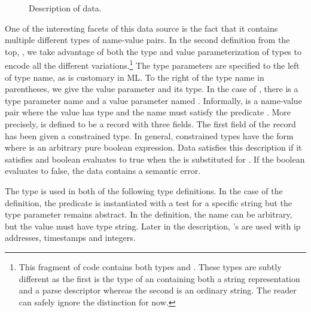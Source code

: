 
\begin{figure}
  \centering
  \small
  
  \caption{Description of \darkstar{} data.}
  \label{fig:darkstar-ml}
\end{figure}

One of the interesting facets of this data source is the fact that
it contains multiple different types of name-value pairs.  In the
second definition from the top, , we take
advantage of both the type and value parameterization of types to
encode all the different 
variations.\footnote{This fragment of code contains both
types  and .  These types are subtly different
as the first is the type of an \pvalue{} containing both a string 
representation and a parse descriptor whereas the second is an 
ordinary string.  The reader can safely ignore the distinction for now.}    
The type parameters
are specified to the left of type name, as is customary in ML.
To the right of the type name in parentheses, we give the
value parameter and its type. 
In the case of , there is a type parameter name 
and a value parameter named .  Informally,
 is a name-value pair where the value has type 
and the name must satisfy the predicate .  More precisely,
 is defined to be
a record with three fields.  The first field of the record
has been given a constrained type.  In general, constrained types have the
form  where  is an arbitrary pure boolean 
expression.  Data  satisfies this description if it satisfies
 and boolean evaluates to true when the \pvalue{} 
is substituted for .  If the boolean evaluates to false, the
data contains a semantic error.  

The  type is used in both of the following type definitions.
In the case of the  definition, the predicate is instantiated
with a test for a specific string but the type parameter remains 
abstract.  In the  
definition, the name can be arbitrary, but the value must have 
type string. Later in the description, 's
are used with ip addresses, timestamps and integers. 

